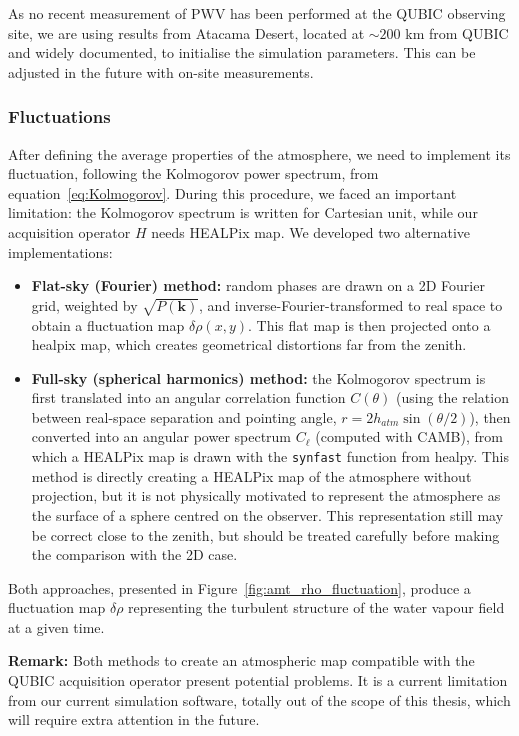 \documentclass[../../thesis.tex]{subfiles}
\begin{document}
As no recent measurement of PWV has been performed at the QUBIC observing site, we are using results from Atacama Desert, located at $\sim 200$ km from QUBIC and widely documented, to initialise the simulation parameters. This can be adjusted in the future with on-site measurements.

\subsubsection{Fluctuations}

After defining the average properties of the atmosphere, we need to implement its fluctuation, following the Kolmogorov power spectrum, from equation~\ref{eq:Kolmogorov}. During this procedure, we faced an important limitation: the Kolmogorov spectrum is written for Cartesian unit, while our acquisition operator $H$ needs HEALPix map. We developed two alternative implementations:

\begin{itemize}
    \item \textbf{Flat-sky (Fourier) method: }random phases are drawn on a 2D Fourier grid, weighted by $\sqrt{P(\mathbf{k})}$, and inverse-Fourier-transformed to real space to obtain a fluctuation map $\delta\rho(x,y)$. This flat map is then projected onto a healpix map, which creates geometrical distortions far from the zenith. 
    \item \textbf{Full-sky (spherical harmonics) method: }the Kolmogorov spectrum is first translated into an angular correlation function $C(\theta)$ (using the relation between real-space separation and pointing angle, $r = 2h_{atm}\sin(\theta/2)$), then converted into an angular power spectrum $C_\ell$ (computed with CAMB), from which a HEALPix map is drawn with the \texttt{synfast} function from healpy. This method is directly creating a HEALPix map of the atmosphere without projection, but it is not physically motivated to represent the atmosphere as the surface of a sphere centred on the observer. This representation still may be correct close to the zenith, but should be treated carefully before making the comparison with the 2D case.
\end{itemize}

Both approaches, presented in Figure~\ref{fig:amt_rho_fluctuation}, produce a fluctuation map $\delta\rho$ representing the turbulent structure of the water vapour field at a given time.

\textbf{Remark: }Both methods to create an atmospheric map compatible with the QUBIC acquisition operator present potential problems. It is a current limitation from our current simulation software, totally out of the scope of this thesis, which will require extra attention in the future.
\end{document}
